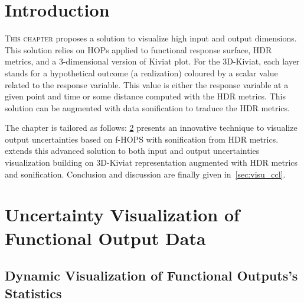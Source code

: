 \section{Introduction}

\lettrine{T}{his chapter} proposes a solution to visualize high input and output dimensions. This solution relies on HOPs applied to functional response surface, HDR metrics,  and a 3-dimensional version of Kiviat plot. For the 3D-Kiviat, each layer stands for a hypothetical outcome (a realization) coloured by a scalar value related to the response variable. This value is either the response variable at a given point and time or some distance computed with the HDR metrics. This solution can be augmented with data sonification to traduce the HDR metrics.

The chapter is tailored as follows: \cref{sec:uqvisu} presents an innovative technique to visualize output uncertainties based on f-HOPS with sonification from HDR metrics.  extends this advanced solution to both input and output uncertainties visualization building on 3D-Kiviat representation augmented with HDR metrics and sonification. Conclusion and discussion are finally given in~\cref{sec:visu_ccl}.


\section{Uncertainty Visualization of Functional Output Data}
\label{sec:uqvisu}

\subsection{Dynamic Visualization of Functional Outputs's Statistics}
\label{subsec:fhop}

%

